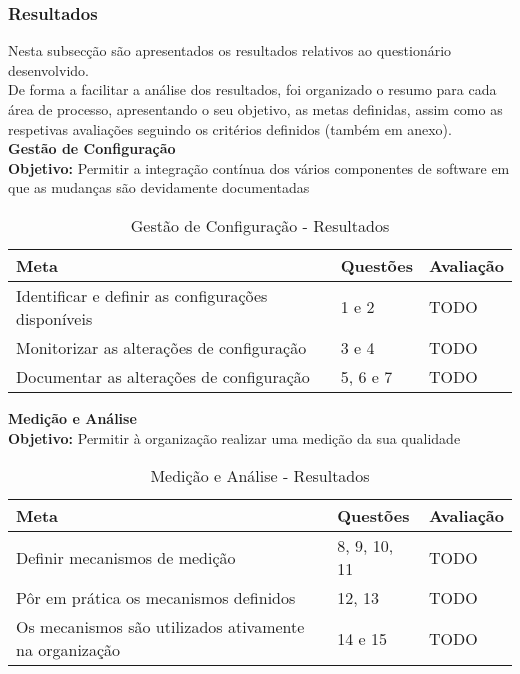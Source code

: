 \documentclass[openany,10pt,a4paper]{article}
\begin{document}
\subsubsection{Resultados}
Nesta subsecção são apresentados os resultados relativos ao questionário desenvolvido. \\
De forma a facilitar a análise dos resultados, foi organizado o resumo para cada área de processo, apresentando o seu objetivo, as metas definidas, assim como as respetivas avaliações seguindo os critérios definidos (também em anexo). \\

\textbf{Gestão de Configuração} \\
\textbf{Objetivo:} Permitir a integração contínua dos vários componentes de software em que as mudanças são devidamente documentadas \\

\begin{table}[h]
    \centering
    \caption{Gestão de Configuração - Resultados}
    \begin{tabular}{p{2in}|p{2in}|p{2in}}
        \hline	
		\textbf{Meta} & \textbf{Questões} & \textbf{Avaliação} \\ \hline
		Identificar e definir as configurações disponíveis & 1 e 2 & TODO \\ \hline
		Monitorizar as alterações de configuração  & 3 e 4 & TODO \\ \hline
		Documentar as alterações de configuração  & 5, 6 e 7 & TODO \\ \hline
    \end{tabular}
    \label{tab:analise-gestconfig}
\end{table}

\textbf{Medição e Análise}  \\
\textbf{Objetivo:} Permitir à organização realizar uma medição da sua qualidade

\begin{table}[h]
    \centering
    \caption{Medição e Análise - Resultados}
    \begin{tabular}{p{2in}|p{2in}|p{2in}}
         \hline	
		\textbf{Meta} & \textbf{Questões} & \textbf{Avaliação} \\ \hline
		Definir mecanismos de medição & 8, 9, 10, 11 & TODO \\ \hline
		Pôr em prática os mecanismos definidos  & 12, 13 & TODO \\ \hline
		Os mecanismos são utilizados ativamente na organização & 14 e 15 & TODO \\ \hline
    \end{tabular}
    \label{tab:analise-medicaoanalise}
\end{table}
\end{document}
